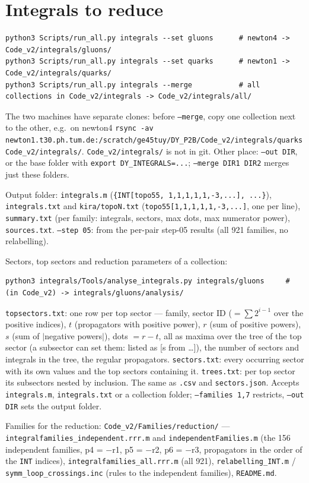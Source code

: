 \documentclass[10pt]{article}
\newcommand{\cmd}[1]{\texttt{#1}}
\begin{document}
\section{Integrals to reduce}
\begin{lstlisting}
python3 Scripts/run_all.py integrals --set gluons      # newton4 -> Code_v2/integrals/gluons/
python3 Scripts/run_all.py integrals --set quarks      # newton1 -> Code_v2/integrals/quarks/
python3 Scripts/run_all.py integrals --merge           # all collections in Code_v2/integrals -> Code_v2/integrals/all/
\end{lstlisting}
The two machines have separate clones: before \cmd{--merge}, copy one collection next to the other, e.g.\ on newton4
\cmd{rsync -av newton1.t30.ph.tum.de:/scratch/ge45tuy/DY\_P2B/Code\_v2/integrals/quarks Code\_v2/integrals/}.
\cmd{Code\_v2/integrals/} is not in git. Other place: \cmd{--out DIR}, or the base folder with
\cmd{export DY\_INTEGRALS=...}; \cmd{--merge DIR1 DIR2} merges just these folders.

Output folder: \cmd{integrals.m} (\cmd{\{INT[topo55, 1,1,1,1,1,-3,...], ...\}}), \cmd{integrals.txt} and
\cmd{kira/topoN.txt} (\cmd{topo55[1,1,1,1,1,-3,...]}, one per line), \cmd{summary.txt} (per family: integrals,
sectors, max dots, max numerator power), \cmd{sources.txt}. \cmd{--step 05}: from the per-pair step-05 results
(all 921 families, no relabelling).

Sectors, top sectors and reduction parameters of a collection:
\begin{lstlisting}
python3 integrals/Tools/analyse_integrals.py integrals/gluons     # (in Code_v2) -> integrals/gluons/analysis/
\end{lstlisting}
\cmd{topsectors.txt}: one row per top sector --- family, sector ID ($=\sum 2^{i-1}$ over the positive indices), $t$
(propagators with positive power), $r$ (sum of positive powers), $s$ (sum of $|$negative powers$|$), dots $=r-t$, all
as maxima over the tree of the top sector (a subsector can set them: listed as [s from \ldots]), the number of
sectors and integrals in the tree, the regular propagators. \cmd{sectors.txt}: every occurring sector with its own
values and the top sectors containing it. \cmd{trees.txt}: per top sector its subsectors nested by inclusion.
The same as \cmd{.csv} and \cmd{sectors.json}. Accepts \cmd{integrals.m}, \cmd{integrals.txt} or a collection folder;
\cmd{--families 1,7} restricts, \cmd{--out DIR} sets the output folder.

Families for the reduction: \cmd{Code\_v2/Families/reduction/} --- \cmd{integralfamilies\_independent.rrr.m} and
\cmd{independentFamilies.m} (the 156 independent families, p4 = $-$r1, p5 = $-$r2, p6 = $-$r3, propagators in the
order of the \cmd{INT} indices), \cmd{integralfamilies\_all.rrr.m} (all 921), \cmd{relabelling\_INT.m} /
\cmd{symm\_loop\_crossings.inc} (rules to the independent families), \cmd{README.md}.
\end{document}
